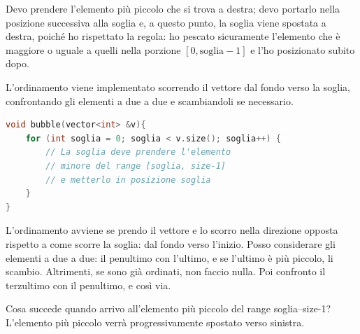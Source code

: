 Devo prendere l'elemento pi\`u piccolo che si trova a destra; devo portarlo nella posizione successiva alla soglia e, a questo punto, la soglia viene spostata a destra, poich\'e ho rispettato la regola: ho pescato sicuramente l'elemento che \`e maggiore o uguale a quelli nella porzione $\left[0, \text{soglia}-1\right]$ e l'ho posizionato subito dopo.

\begin{center}
\end{center}

\begin{codeexample}
L'ordinamento viene implementato scorrendo il vettore dal fondo verso la soglia,
confrontando gli elementi a due a due e scambiandoli se necessario.

\begin{codebox}
\begin{lstlisting}[language=C++]
void bubble(vector<int> &v){
    for (int soglia = 0; soglia < v.size(); soglia++) {
        // La soglia deve prendere l'elemento
        // minore del range [soglia, size-1]
        // e metterlo in posizione soglia
    }
}
\end{lstlisting}
\end{codebox}
\end{codeexample}

L'ordinamento avviene se prendo il vettore e lo scorro nella direzione opposta rispetto a come scorre la soglia: dal fondo verso l'inizio. Posso considerare gli elementi a due a due: il penultimo con l'ultimo, e se l'ultimo \`e pi\`u piccolo, li scambio. Altrimenti, se sono gi\`a ordinati, non faccio nulla. Poi confronto il terzultimo con il penultimo, e cos\`i via.

Cosa succede quando arrivo all'elemento pi\`u piccolo del range soglia--size-1? L'elemento pi\`u piccolo verr\`a progressivamente spostato verso sinistra.

